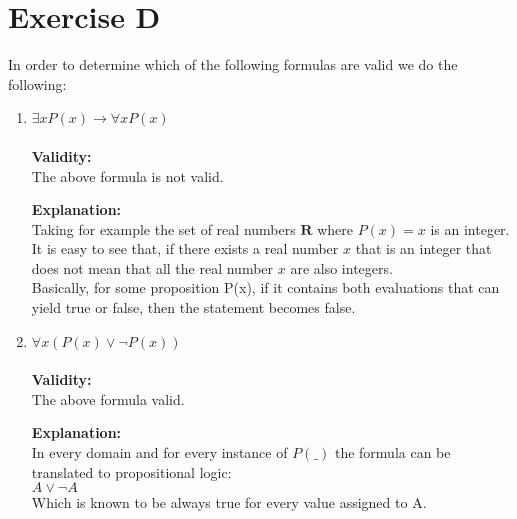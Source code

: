 \section{Exercise D} 
In order to determine which of the following formulas are valid we do the following:
\begin{enumerate}
\item $\exists x P(x) \to \forall x P(x)$\\
\vspace{-3mm} \\
\textbf{Validity:}\\ 
The above formula is not valid.  

\textbf{Explanation:} \\
Taking for example the set of real numbers $\mathbf{R}$ where $P(x)=x$ is an integer. It is easy to see that, if there exists a real number $x$ that is an integer that does not mean that all the real number $x$ are also integers.\\

Basically, for some proposition P(x), if it contains both evaluations that can yield true or false, then the statement becomes false.\\

\item $\forall x(P(x) \lor \neg P(x))$ \\
\vspace{-3mm} \\
\textbf{Validity:} \\
The above formula valid. 

\textbf{Explanation:}\\
In every domain and for every instance of $P(\_)$ the formula can be translated to propositional logic:\\
$A \lor \neg A$ \\
Which is known to be always true for every value assigned to A.
\end{enumerate}
